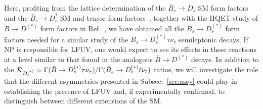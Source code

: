 \documentclass[aps,superscriptaddress,showpacs,nofootinbib,11pt]{revtex4-1}
\begin{document}
Here, profiting from the lattice determination of the  $\bar B_s\to D_s$ SM form factors~\cite{McLean:2019qcx} and the $\bar B_s\to D_s^*$ SM and tensor form factors~\cite{Harrison:2023dzh}, together with the 
 HQET study of $\bar B\to D^{(*)}$ form factors in Ref.~\cite{Bernlochner:2017jka}, we have  
obtained all the  $\bar B_s\to D^{(*)}_s$ form factors needed for a similar study of the $\bar B_s\to D^{(*)}_s\tau\bar\nu_\tau$ semileptonic decays. If NP is responsible for LFUV, one would expect to see its effects in these reactions at a level similar to that found in the analogous $\bar B\to D^{(*)}$ decays. In addition to the  ${\cal R}_{D^{(*)}_s} =\Gamma(\bar B\to D^{(*)}_s\tau\bar\nu_\tau)/\Gamma(\bar B_s\to D^{(*)}_s\ell\bar\nu_{\ell})$ ratios, we will investigate the role that the different asymmetries presented in Subsec.~\ref{sec:assy} could play in establishing the presence of LFUV and, if experimentally confirmed, to distinguish between different extensions of the SM.
\end{document}

